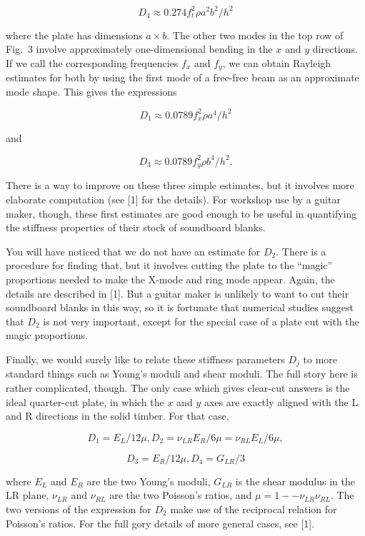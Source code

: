  $$D_4 \approx 0.274 f_t^2 \rho a^2 b^2/h^2 \tag{3}$$ 

  where the plate has dimensions $a \times b$. The other two modes in the top 
  row of Fig.\ 3 involve approximately one-dimensional bending in the $x$ and 
  $y$ directions. If we call the corresponding frequencies $f_x$ and $f_y$, we 
  can obtain Rayleigh estimates for both by using the first mode of a free-free 
  beam as an approximate mode shape. This gives the expressions 

  $$D_1 \approx 0.0789 f_x^2 \rho a^4/h^2 \tag{4}$$ 

  and 

  $$D_3 \approx 0.0789 f_y^2 \rho b^4/h^2 . \tag{5}$$ 

  There is a way to improve on these three simple estimates, but it involves 
  more elaborate computation (see [1] for the details). For workshop use by a 
  guitar maker, though, these first estimates are good enough to be useful in 
  quantifying the stiffness properties of their stock of soundboard blanks. 

  You will have noticed that we do not have an estimate for $D_2$. There is a 
  procedure for finding that, but it involves cutting the plate to the 
  ``magic'' proportions needed to make the X-mode and ring mode appear. Again, 
  the details are described in [1]. But a guitar maker is unlikely to want to 
  cut their soundboard blanks in this way, so it is fortunate that numerical 
  studies suggest that $D_2$ is not very important, except for the special case 
  of a plate cut with the magic proportions. 

  Finally, we would surely like to relate these stiffness parameters $D_j$ to 
  more standard things such as Young's moduli and shear moduli. The full story 
  here is rather complicated, though. The only case which gives clear-cut 
  answers is the ideal quarter-cut plate, in which the $x$ and $y$ axes are 
  exactly aligned with the L and R directions in the solid timber. For that 
  case, 

  $$D_1 = E_L/12 \mu, D_2 = \nu_{LR}E_R/6 \mu = \nu_{RL}E_L/6 \mu, $$ 

  $$D_3 = E_R/12 \mu, D_4 = G_{LR}/3 \tag{6}$$ 

  where $E_L$ and $E_R$ are the two Young's moduli, $G_{LR}$ is the shear 
  modulus in the LR plane, $\nu_{LR}$ and $\nu_{RL}$ are the two Poisson's 
  ratios, and $\mu=1 -- \nu_{LR} \nu_{RL} .$ The two versions of the expression 
  for $D_2$ make use of the reciprocal relation for Poisson's ratios. For the 
  full gory details of more general cases, see [1]. 

